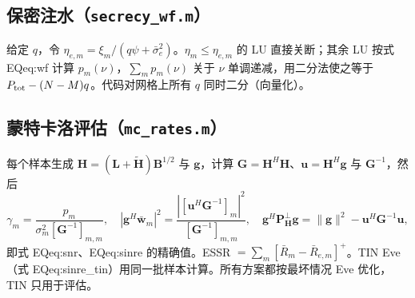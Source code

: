 \documentclass[11pt,a4paper]{ctexart}
\newcommand{\code}[1]{\texttt{#1}}
\newcommand{\Ptot}{P_{\rm tot}}
\begin{document}
\subsection{保密注水（\code{secrecy\_wf.m}）}
给定 $q$，令 $\eta_{e,m}=\xi_m/(q\psi+\bar\sigma_e^2)$。$\eta_m\le\eta_{e,m}$ 的 LU 直接关断；其余 LU 按式 EQ{eq:wf} 计算 $p_m(\nu)$，$\sum_mp_m(\nu)$ 关于 $\nu$ 单调递减，用二分法使之等于 $\Ptot-(N-M)q$。代码对网格上所有 $q$ 同时二分（向量化）。

\subsection{蒙特卡洛评估（\code{mc\_rates.m}）}
每个样本生成 $\mathbf H=(\mathbf L+\tilde{\mathbf H})\mathbf B^{1/2}$ 与 $\mathbf g$，计算 $\mathbf G=\mathbf H^H\mathbf H$、$\mathbf u=\mathbf H^H\mathbf g$ 与 $\mathbf G^{-1}$，然后
\[
\gamma_m=\frac{p_m}{\sigma_m^2[\mathbf G^{-1}]_{m,m}},\quad
|\mathbf g^H\bar{\mathbf w}_m|^2=\frac{|[\mathbf u^H\mathbf G^{-1}]_m|^2}{[\mathbf G^{-1}]_{m,m}},\quad
\mathbf g^H\mathbf P_{\mathbf H}^\perp\mathbf g=\|\mathbf g\|^2-\mathbf u^H\mathbf G^{-1}\mathbf u,
\]
即式 EQ{eq:snr}、EQ{eq:sinre} 的精确值。ESSR $=\sum_m[\bar R_m-\bar R_{e,m}]^+$。TIN Eve（式 EQ{eq:sinre_tin}）用同一批样本计算。所有方案都按最坏情况 Eve 优化，TIN 只用于评估。

\end{document}
